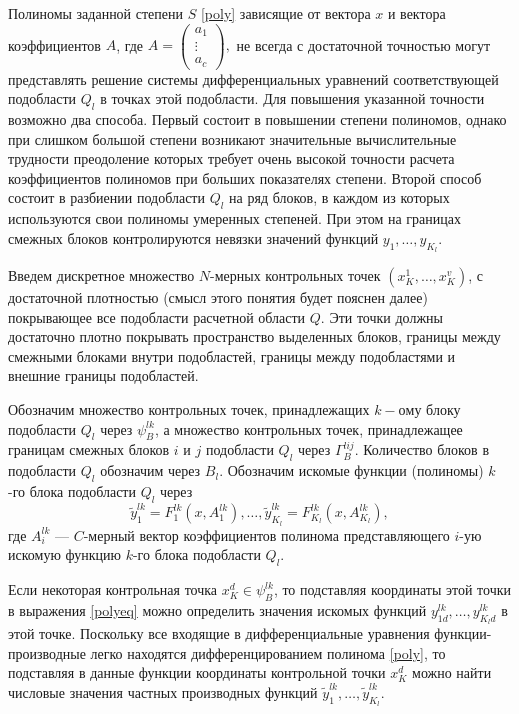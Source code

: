 \documentclass[a4paper,12pt]{article}
\begin{document}
Полиномы заданной степени $S$ \eqref{poly} зависящие от вектора $x$ и
вектора коэффициентов $A$, где $A=\left(\begin{matrix}a_1\\\vdots\\
a_c\end{matrix}\right),$ не всегда с достаточной точностью могут
представлять решение системы дифференциальных уравнений соответствующей
подобласти $Q_l$ в точках этой подобласти. Для повышения указанной
точности возможно два способа.  Первый состоит в повышении степени
полиномов, однако при слишком большой степени возникают значительные
вычислительные трудности преодоление которых требует очень высокой
точности расчета коэффициентов полиномов при больших показателях
степени. Второй способ состоит в разбиении подобласти $Q_l$ на ряд
блоков, в каждом из которых используются свои полиномы умеренных
степеней. При этом на границах смежных блоков контролируются невязки
значений функций $y_1,\ldots,y_{K_l}$.

Введем дискретное множество $N$-мерных контрольных точек
$(x^1_K,\ldots,x^v_K)$, с достаточной плотностью (смысл этого понятия
будет пояснен далее) покрывающее все подобласти расчетной области $Q$.
Эти точки должны достаточно плотно покрывать пространство выделенных
блоков, границы между смежными блоками внутри подобластей, границы между
подобластями и внешние границы подобластей. 

Обозначим множество контрольных точек, принадлежащих $k-ому$ блоку 
подобласти $Q_l$ через $\psi^{lk}_B$, а множество контрольных точек,
принадлежащее границам смежных блоков $i$ и $j$ подобласти $Q_l$ через
$\Gamma^{lij}_B$. Количество блоков в подобласти $Q_l$ обозначим через
$B_l$. Обозначим искомые функции (полиномы) $k$-го блока подобласти
$Q_l$ через 
\begin{equation}
    \tilde{y}^{lk}_1 = F^{lk}_1(x,A^{lk}_1), \ldots,
    \tilde{y}^{lk}_{K_l} = F^{lk}_{K_l}(x,A^{lk}_{K_l}),
    \label{polyeq}
\end{equation}
где $A^{lk}_i$ --- $C$-мерный вектор коэффициентов полинома представляющего
$i$-ую искомую функцию $k$-го блока подобласти $Q_l$.

Если некоторая контрольная точка $x^d_K \in \psi^{lk}_B$, то подставляя
координаты этой точки в выражения \eqref{polyeq} можно определить
значения искомых функций $y^{lk}_{1d},\ldots,y^{lk}_{K_ld}$ в этой точке.
Поскольку все входящие в дифференциальные уравнения
функции-производные легко находятся дифференцированием полинома
\eqref{poly}, то подставляя в данные функции координаты контрольной
точки $x^d_K$ можно найти числовые значения частных производных
функций $\tilde{y}^{lk}_1, \ldots, \tilde{y}^{lk}_{K_l}$.
\end{document}
